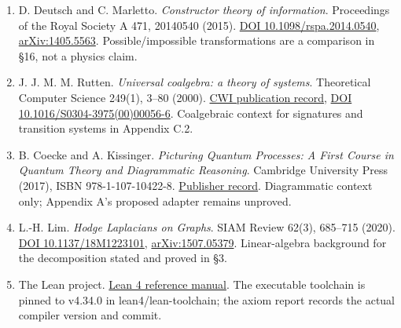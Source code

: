 \documentclass[
  11pt,
]{article}
\renewcommand{\_}{\ddcunderscore\allowbreak}
\begin{document}
\begin{enumerate}
  separation.
\item
  D. Deutsch and C. Marletto. \emph{Constructor theory of information}.
  Proceedings of the Royal Society A 471, 20140540 (2015).
  \href{https://doi.org/10.1098/rspa.2014.0540}{DOI
  10.1098/rspa.2014.0540},
  \href{https://arxiv.org/abs/1405.5563}{arXiv:1405.5563}.
  Possible/impossible transformations are a comparison in §16, not a
  physics claim.
\item
  J. J. M. M. Rutten. \emph{Universal coalgebra: a theory of systems}.
  Theoretical Computer Science 249(1), 3--80 (2000).
  \href{https://ir.cwi.nl/pub/48}{CWI publication record},
  \href{https://doi.org/10.1016/S0304-3975(00)00056-6}{DOI
  10.1016/S0304-3975(00)00056-6}. Coalgebraic context for signatures and
  transition systems in Appendix C.2.
\item
  B. Coecke and A. Kissinger. \emph{Picturing Quantum Processes: A First
  Course in Quantum Theory and Diagrammatic Reasoning}. Cambridge
  University Press (2017), ISBN 978-1-107-10422-8.
  \href{https://www.cambridge.org/core/books/picturing-quantum-processes/1119568B3101F3A685BE832FEEC53E52}{Publisher
  record}. Diagrammatic context only; Appendix A's proposed adapter
  remains unproved.
\item
  L.-H. Lim. \emph{Hodge Laplacians on Graphs}. SIAM Review 62(3),
  685--715 (2020). \href{https://doi.org/10.1137/18M1223101}{DOI
  10.1137/18M1223101},
  \href{https://arxiv.org/abs/1507.05379}{arXiv:1507.05379}.
  Linear-algebra background for the decomposition stated and proved in
  §3.
\item
  The Lean project.
  \href{https://lean-lang.org/doc/reference/latest/}{Lean 4 reference
  manual}. The executable toolchain is pinned to v4.34.0 in
  lean4/lean-toolchain; the axiom report records the actual compiler
  version and commit.
\end{enumerate}
\end{document}
